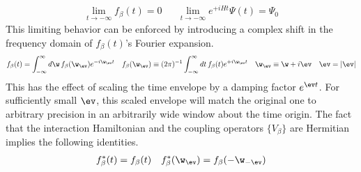 \begin{rmk}
\begin{align}
\label{eq:boundary-conditions}
  \lim_{t\rightarrow-\infty}
  f_\beta(t)
=
  0
&&
  \lim_{t\rightarrow-\infty}
  e^{+iHt}
  \Psi(t)
=
  \Psi_0
\end{align}
This limiting behavior can be enforced by introducing a complex shift in the frequency domain of $f_\beta(t)$'s Fourier expansion.\footnotemark
{}
\begin{align}
\label{eq:frequency-envelopes}
  f_\beta(t)
=
  \int_{-\infty}^\infty
  d\w\,
  f_\beta(\w_\ev)
  e^{-i\w_\ev t}
&&
  f_\beta(\w_\ev)
\equiv
  (2\pi)^{-1}
  \int_{-\infty}^\infty
  dt\,
  f_\beta(t)
  e^{+i\w_\ev t}
&&
  \w_\ev
\equiv
  \w
+
  i\ev
&&
  \ev
=
  |\ev|
\end{align}
This has the effect of scaling the time envelope by a damping factor $e^{\ev t}$.
For sufficiently small $\ev$, this scaled envelope will match the original one to arbitrary precision in an arbitrarily wide window about the time origin.
The fact that the interaction Hamiltonian and the coupling operators $\{V_\beta\}$ are Hermitian implies the following identities.
\begin{align}
  f_\beta^*(t)
=
  f_\beta(t)
&&
  f_\beta^*(\w_{\ev})
=
  f_\beta(-\w_{-\ev})
\end{align}
\end{rmk}


